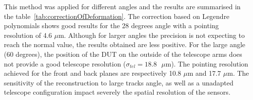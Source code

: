       This method was applied for different angles and the results are summarised in the table~\ref{tab:correctionOfDeformation}. 
      The correction based on Legendre polynomials shows good results for the 28 degrees angle with a pointing resolution of 4.6 $\mu\text{m}$.
      Although for larger angles the precision is not expecting to reach the normal value, the results obtained are less positive.
      For the large angle (60 degrees), the position of the \gls{DUT} on the outside of the telescope arms does not provide a good telescope resolution ($\sigma_{tel} = 18.8 \text{ }\mu\text{m}$).
      The pointing resolution achieved for the front and back planes are respectively 10.8 $\mu\text{m}$ and 17.7 $\mu\text{m}$.
      The sensitivity of the reconstruction to large tracks angle, as well as a unadapted telescope configuration impact severely the spatial resolution of the sensors.

